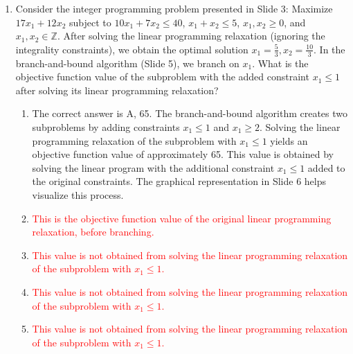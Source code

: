 \documentclass{article}%
\newcommand{\incorrect}[1]{\textcolor{red}{#1}}
\begin{document}
\begin{enumerate}
\begin{enumerate}%
\item \incorrect{The dimension of $y$ is determined by the number of rows in $A$, which is $m$, not $n$.}%
\item Farkas' Lemma states that if $Ax \le b$ has no solution, then there exists a vector $y$ of dimension $m \times 1$ such that $A^T y = 0$, $y \ge 0$, and $b^T y < 0$. The dimension of $y$ is determined by the dimension of $b$, which is $m \times 1$.%
\item \incorrect{This is an incorrect dimension for $y$ in the context of Farkas' Lemma.}%
\item \incorrect{This is an incorrect dimension for $y$ in the context of Farkas' Lemma.}%
\item \incorrect{Farkas' Lemma guarantees the existence of such a vector $y$ if the original system has no solution.}%
\end{enumerate}%
\vspace{1em}%
\item Consider the integer programming problem presented in Slide 3: Maximize $17x_1 + 12x_2$ subject to $10x_1 + 7x_2 \le 40$, $x_1 + x_2 \le 5$, $x_1, x_2 \ge 0$, and $x_1, x_2 \in \mathbb{Z}$.  After solving the linear programming relaxation (ignoring the integrality constraints), we obtain the optimal solution $x_1 = \frac{5}{3}, x_2 = \frac{10}{3}$. In the branch-and-bound algorithm (Slide 5), we branch on $x_1$. What is the objective function value of the subproblem with the added constraint $x_1 \le 1$ after solving its linear programming relaxation?%
\begin{enumerate}%
\item The correct answer is A, 65.  The branch-and-bound algorithm creates two subproblems by adding constraints $x_1 \le 1$ and $x_1 \ge 2$.  Solving the linear programming relaxation of the subproblem with $x_1 \le 1$ yields an objective function value of approximately 65. This value is obtained by solving the linear program with the additional constraint $x_1 \le 1$ added to the original constraints. The graphical representation in Slide 6 helps visualize this process.%
\item \incorrect{This is the objective function value of the original linear programming relaxation, before branching.}%
\item \incorrect{This value is not obtained from solving the linear programming relaxation of the subproblem with $x_1 \le 1$.}%
\item \incorrect{This value is not obtained from solving the linear programming relaxation of the subproblem with $x_1 \le 1$.}%
\item \incorrect{This value is not obtained from solving the linear programming relaxation of the subproblem with $x_1 \le 1$.}%
\end{enumerate}%
\vspace{1em}%
\end{enumerate}

%
\end{document}
